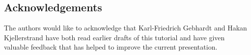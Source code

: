 \subsection*{Acknowledgements}
The authors would like to acknowledge that Karl-Friedrich Gebhardt and Hakan Kjellerstrand 
have both  read earlier drafts of
this tutorial and have given valuable feedback that has helped to improve the current
presentation. 

